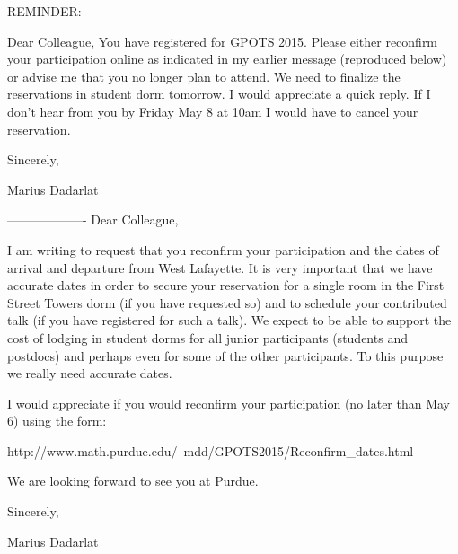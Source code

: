 REMINDER:

Dear Colleague,
You have registered for GPOTS 2015.
Please either reconfirm your participation online as indicated in my earlier message (reproduced below)
or advise me that you no longer plan to attend.
We need to finalize the reservations in student dorm tomorrow. 
I would appreciate a quick reply.
If I don't hear from you by Friday May 8 at 10am I would have to cancel your reservation.

Sincerely,

Marius Dadarlat

-------------------
Dear Colleague,

I am writing to request that you reconfirm your participation and the dates of arrival and departure from West Lafayette.
It is very important that we have accurate dates in order to secure your reservation for a single room in the First Street Towers dorm (if you have requested so) and to schedule your contributed talk (if you have registered for such a talk).
We expect to be able to support the cost of lodging in student dorms for all junior participants (students and postdocs) and perhaps even for some of the other participants. To this purpose we really need accurate dates.

I would appreciate if you would reconfirm your participation (no later than May 6) using the form:

http://www.math.purdue.edu/~mdd/GPOTS2015/Reconfirm_dates.html

We are looking forward to see you at Purdue.

Sincerely,

Marius Dadarlat



